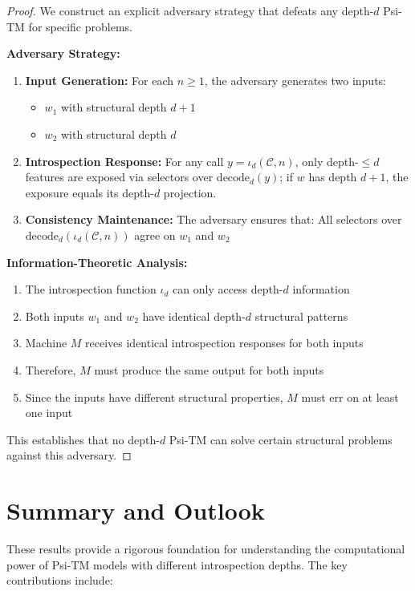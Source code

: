 \begin{proof}
We construct an explicit adversary strategy that defeats any depth-$d$ Psi-TM for specific problems.

\textbf{Adversary Strategy:}
\begin{enumerate}
\item \textbf{Input Generation:} For each $n \geq 1$, the adversary generates two inputs:
  \begin{itemize}
  \item $w_1$ with structural depth $d+1$
  \item $w_2$ with structural depth $d$
  \end{itemize}

\item \textbf{Introspection Response:} For any call $y=\iota_d(\mathcal{C},n)$, only depth-$\le d$ features are exposed via selectors over $\mathrm{decode}_d(y)$; if $w$ has depth $d{+}1$, the exposure equals its depth-$d$ projection.

\item \textbf{Consistency Maintenance:} The adversary ensures that:
All selectors over $\mathrm{decode}_d(\iota_d(\mathcal{C},n))$ agree on $w_1$ and $w_2$
\end{enumerate}

\textbf{Information-Theoretic Analysis:}
\begin{enumerate}
\item The introspection function $\iota_d$ can only access depth-$d$ information
\item Both inputs $w_1$ and $w_2$ have identical depth-$d$ structural patterns
\item Machine $M$ receives identical introspection responses for both inputs
\item Therefore, $M$ must produce the same output for both inputs
\item Since the inputs have different structural properties, $M$ must err on at least one input
\end{enumerate}

This establishes that no depth-$d$ Psi-TM can solve certain structural problems against this adversary.
\end{proof}

\section{Summary and Outlook}

These results provide a rigorous foundation for understanding the computational power of Psi-TM models with different introspection depths. The key contributions include:

